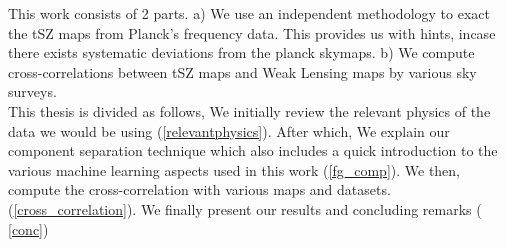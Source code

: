 This work consists of 2 parts. a) We use an independent methodology to exact the tSZ maps from Planck's frequency data. This provides us with hints, incase
there exists systematic deviations from the planck skymaps. b) We compute cross-correlations between tSZ maps and Weak Lensing maps by various sky surveys.
\\
This thesis is divided as follows, We initially review the relevant physics of the data we would be using (\ref{relevantphysics}). After which, We explain our
component separation technique which also includes a quick introduction to the various machine learning aspects used in this work (\ref{fg_comp}). We then,
compute the cross-correlation with various maps and datasets. (\ref{cross_correlation}). We finally present our results and concluding remarks
( \ref{conc})












